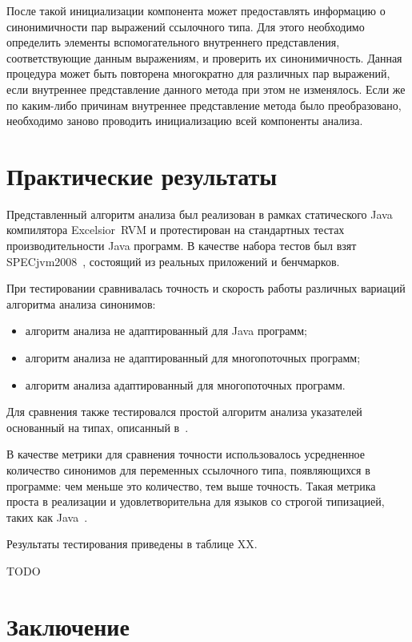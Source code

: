 \documentclass[14pt,titlepage]{extarticle}
\newcommand{\eng}[1]{{\English#1}}
\let\oldsection\section
\renewcommand{\section}{\newpage\oldsection}
\newcommand{\sectionwithoutnumber}[1]{
  \section*{#1}
  \addcontentsline{toc}{section}{#1}
}
\newcommand{\java}{\eng{Java}\xspace}
\begin{document}
      После такой инициализации компонента может предоставлять информацию о
      синонимичности пар выражений ссылочного типа. Для этого необходимо
      определить элементы вспомогательного внутреннего представления,
      соответствующие данным выражениям, и проверить их синонимичность.
      Данная процедура может быть повторена многократно для
      различных пар выражений, если внутреннее представление данного метода при
      этом не изменялось. Если же по каким-либо причинам внутреннее
      представление метода было преобразовано, необходимо заново проводить
      инициализацию всей компоненты анализа.

  \section{Практические результаты}

    Представленный алгоритм анализа был реализован в рамках статического
    \java компилятора \eng{Excelsior~RVM} и протестирован на стандартных тестах
    производительности \java программ.
    В качестве набора тестов был взят SPECjvm2008~\cite{spec_jvm}, состоящий из
    реальных приложений и бенчмарков.

    При тестировании сравнивалась точность и скорость работы различных вариаций
    алгоритма анализа синонимов:
    \begin{itemize}
      \item алгоритм анализа не адаптированный для \java программ;
      \item алгоритм анализа не адаптированный для многопоточных программ;
      \item алгоритм анализа адаптированный для многопоточных программ.
    \end{itemize}
    Для сравнения также тестировался простой алгоритм анализа указателей
    основанный на типах, описанный в~\cite{diwan_tbaa}.

    В качестве метрики для сравнения точности использовалось усредненное
    количество синонимов для переменных ссылочного типа, появляющихся в
    программе: чем меньше это количество, тем выше точность. Такая метрика
    проста в реализации и удовлетворительна для языков со строгой типизацией,
    таких как \java~\cite{hind_pointer_analysis_not_solved_yet}.

    Результаты тестирования приведены в таблице XX.

    TODO

  \sectionwithoutnumber{Заключение}
\end{document}
